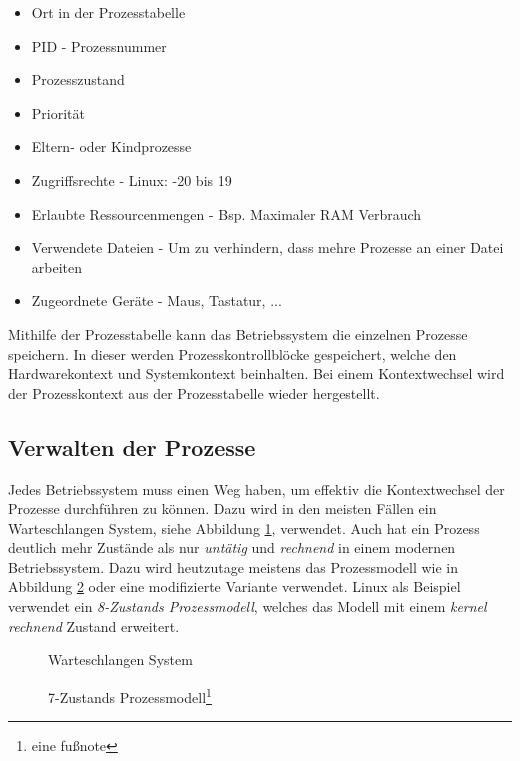\begin{itemize}
    \setlength\itemsep{0pt}
    \item Ort in der Prozesstabelle
    \item PID - Prozessnummer
    \item Prozesszustand
    \item Priorität
    \item Eltern- oder Kindprozesse
    \item Zugriffsrechte - Linux: -20 bis 19
    \item Erlaubte Ressourcenmengen - Bsp. Maximaler RAM Verbrauch
    \item Verwendete Dateien - Um zu verhindern, dass mehre Prozesse an einer Datei arbeiten
    \item Zugeordnete Geräte - Maus, Tastatur, ...
\end{itemize}

Mithilfe der Prozesstabelle kann das Betriebssystem die einzelnen Prozesse speichern. In dieser werden Prozesskontrollblöcke gespeichert, welche den Hardwarekontext und Systemkontext beinhalten. Bei einem Kontextwechsel wird der Prozesskontext aus der Prozesstabelle wieder hergestellt.

\newpage

\subsection{Verwalten der Prozesse}

Jedes Betriebssystem muss einen Weg haben, um effektiv die Kontextwechsel der Prozesse durchführen zu können. Dazu wird in den meisten Fällen ein Warteschlangen System, siehe Abbildung \ref{Warteschlange Prozesse}, verwendet. Auch hat ein Prozess deutlich mehr Zustände als nur \textit{untätig} und \textit{rechnend} in einem modernen Betriebssystem. Dazu wird heutzutage meistens das Prozessmodell wie in Abbildung \ref{Prozessmodell} oder eine modifizierte Variante verwendet. Linux als Beispiel verwendet ein \textit{8-Zustands Prozessmodell}, welches das Modell mit einem \textit{kernel rechnend} Zustand erweitert.

\begin{figure}[h]
    \centering
    
    \caption{Warteschlangen System\protect\footnotemark}
    \label{Warteschlange Prozesse}
\end{figure}
\begin{figure}[h]
    \centering
    
    \caption{7-Zustands Prozessmodell\protect\footnote{eine fußnote}}
    \label{Prozessmodell}
\end{figure}

